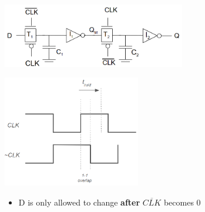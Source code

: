 \documentclass{article}
\begin{document}
\begin{itemize}
\begin{itemize}
            \begin{minipage}[c]{0.4\textwidth}
                \centering
                \includegraphics[width=8cm, scale=1]{registerRace.PNG}
                \captionsetup{justification=centering}
            \end{minipage}%
            \begin{minipage}[c]{0.6\textwidth}
                \centering
                \includegraphics[width=6cm, scale=1]{holdtime.PNG}
                \captionsetup{justification=centering}
            \end{minipage}%
                \begin{itemize}
                    \item D is only allowed to change \textbf{after} $\overline{CLK}$ becomes 0
                \end{itemize}
        \end{itemize}
\end{itemize}
\end{document}
